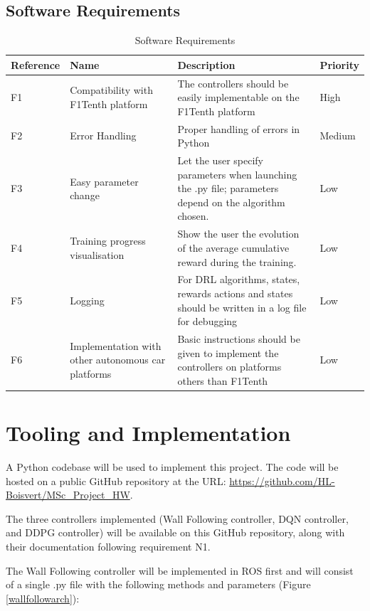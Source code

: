 \subsection{Software Requirements}
\label{softreq}

\begin{table}[H]
\centering
\begin{tabularx}{\textwidth}{||l|X|X|l||} 
 \hline
 Reference & Name & Description & Priority\\ [0.5ex] 
 \hline\hline
 F1 & Compatibility with F1Tenth platform & The controllers should be easily implementable on the F1Tenth platform & High\\
 \hline
 F2 & Error Handling & Proper handling of errors in Python & Medium\\
 \hline
 F3 & Easy parameter change & Let the user specify parameters when launching the .py file; parameters depend on the algorithm chosen. & Low\\
 \hline
 F4 & Training progress visualisation & Show the user the evolution of the average cumulative reward during the training. & Low\\
 \hline
 F5 &  Logging & For DRL algorithms, states, rewards actions and states should be written in a log file for debugging & Low \\
 \hline
 F6 &  Implementation with other autonomous car platforms & Basic instructions should be given to implement the controllers on platforms others than F1Tenth & Low \\ [1ex]
 \hline

\end{tabularx}
\caption{Software Requirements}
\label{sofreqtab}
\end{table}

\section{Tooling and Implementation}
\label{toolimp}

A Python codebase will be used to implement this project. The code will be hosted on a public GitHub repository at the URL: \url{https://github.com/HL-Boisvert/MSc_Project_HW}. \newline

The three controllers implemented (Wall Following controller, DQN controller, and DDPG controller) will be available on this GitHub repository, along with their documentation following requirement N1.

The Wall Following controller will be implemented in ROS first and will consist of a single .py file with the following methods and parameters (Figure \ref{wallfollowarch}):


